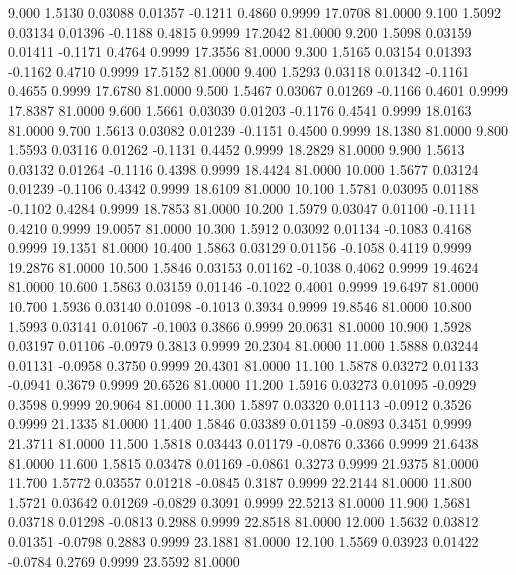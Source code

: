    9.000   1.5130   0.03088   0.01357  -0.1211   0.4860   0.9999  17.0708  81.0000
   9.100   1.5092   0.03134   0.01396  -0.1188   0.4815   0.9999  17.2042  81.0000
   9.200   1.5098   0.03159   0.01411  -0.1171   0.4764   0.9999  17.3556  81.0000
   9.300   1.5165   0.03154   0.01393  -0.1162   0.4710   0.9999  17.5152  81.0000
   9.400   1.5293   0.03118   0.01342  -0.1161   0.4655   0.9999  17.6780  81.0000
   9.500   1.5467   0.03067   0.01269  -0.1166   0.4601   0.9999  17.8387  81.0000
   9.600   1.5661   0.03039   0.01203  -0.1176   0.4541   0.9999  18.0163  81.0000
   9.700   1.5613   0.03082   0.01239  -0.1151   0.4500   0.9999  18.1380  81.0000
   9.800   1.5593   0.03116   0.01262  -0.1131   0.4452   0.9999  18.2829  81.0000
   9.900   1.5613   0.03132   0.01264  -0.1116   0.4398   0.9999  18.4424  81.0000
  10.000   1.5677   0.03124   0.01239  -0.1106   0.4342   0.9999  18.6109  81.0000
  10.100   1.5781   0.03095   0.01188  -0.1102   0.4284   0.9999  18.7853  81.0000
  10.200   1.5979   0.03047   0.01100  -0.1111   0.4210   0.9999  19.0057  81.0000
  10.300   1.5912   0.03092   0.01134  -0.1083   0.4168   0.9999  19.1351  81.0000
  10.400   1.5863   0.03129   0.01156  -0.1058   0.4119   0.9999  19.2876  81.0000
  10.500   1.5846   0.03153   0.01162  -0.1038   0.4062   0.9999  19.4624  81.0000
  10.600   1.5863   0.03159   0.01146  -0.1022   0.4001   0.9999  19.6497  81.0000
  10.700   1.5936   0.03140   0.01098  -0.1013   0.3934   0.9999  19.8546  81.0000
  10.800   1.5993   0.03141   0.01067  -0.1003   0.3866   0.9999  20.0631  81.0000
  10.900   1.5928   0.03197   0.01106  -0.0979   0.3813   0.9999  20.2304  81.0000
  11.000   1.5888   0.03244   0.01131  -0.0958   0.3750   0.9999  20.4301  81.0000
  11.100   1.5878   0.03272   0.01133  -0.0941   0.3679   0.9999  20.6526  81.0000
  11.200   1.5916   0.03273   0.01095  -0.0929   0.3598   0.9999  20.9064  81.0000
  11.300   1.5897   0.03320   0.01113  -0.0912   0.3526   0.9999  21.1335  81.0000
  11.400   1.5846   0.03389   0.01159  -0.0893   0.3451   0.9999  21.3711  81.0000
  11.500   1.5818   0.03443   0.01179  -0.0876   0.3366   0.9999  21.6438  81.0000
  11.600   1.5815   0.03478   0.01169  -0.0861   0.3273   0.9999  21.9375  81.0000
  11.700   1.5772   0.03557   0.01218  -0.0845   0.3187   0.9999  22.2144  81.0000
  11.800   1.5721   0.03642   0.01269  -0.0829   0.3091   0.9999  22.5213  81.0000
  11.900   1.5681   0.03718   0.01298  -0.0813   0.2988   0.9999  22.8518  81.0000
  12.000   1.5632   0.03812   0.01351  -0.0798   0.2883   0.9999  23.1881  81.0000
  12.100   1.5569   0.03923   0.01422  -0.0784   0.2769   0.9999  23.5592  81.0000
